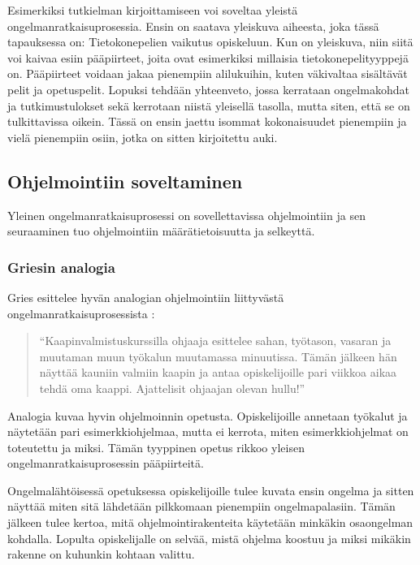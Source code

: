 Esimerkiksi tutkielman kirjoittamiseen voi soveltaa yleistä
ongelmanratkaisuprosessia. Ensin on saatava yleiskuva aiheesta, joka tässä
tapauksessa on: Tietokonepelien vaikutus opiskeluun. Kun on yleiskuva, niin
siitä voi kaivaa esiin pääpiirteet, joita ovat esimerkiksi millaisia
tietokonepelityyppejä on. Pääpiirteet voidaan jakaa pienempiin alilukuihin,
kuten väkivaltaa sisältävät pelit ja opetuspelit. Lopuksi tehdään yhteenveto,
jossa kerrataan ongelmakohdat ja tutkimustulokset sekä kerrotaan niistä
yleisellä tasolla, mutta siten, että se on tulkittavissa oikein. Tässä on ensin
jaettu isommat kokonaisuudet pienempiin ja vielä pienempiin osiin, jotka on
sitten kirjoitettu auki.

\subsection{Ohjelmointiin soveltaminen}

Yleinen ongelmanratkaisuprosessi on sovellettavissa ohjelmointiin ja sen
seuraaminen tuo ohjelmointiin määrätietoisuutta ja selkeyttä.

\subsubsection{Griesin analogia}

Gries esittelee hyvän analogian ohjelmointiin liittyvästä
ongelmanratkaisuprosessista \cite{Gries:1974:WTI:953057.810447}:

\begin{quotation}
``Kaapinvalmistuskurssilla ohjaaja esittelee sahan, työtason, vasaran ja
muutaman muun työkalun muutamassa minuutissa. Tämän jälkeen hän näyttää
kauniin valmiin kaapin ja antaa opiskelijoille pari viikkoa aikaa tehdä oma
kaappi. Ajattelisit ohjaajan olevan hullu!''
\end{quotation}

Analogia kuvaa hyvin ohjelmoinnin opetusta. Opiskelijoille annetaan työkalut ja
näytetään pari esimerkkiohjelmaa, mutta ei kerrota, miten esimerkkiohjelmat on
toteutettu ja miksi. Tämän tyyppinen opetus rikkoo yleisen
ongelmanratkaisuprosessin pääpiirteitä.

Ongelmalähtöisessä opetuksessa opiskelijoille tulee kuvata ensin ongelma ja
sitten näyttää miten sitä lähdetään pilkkomaan pienempiin ongelmapalasiin. Tämän
jälkeen tulee kertoa, mitä ohjelmointirakenteita käytetään minkäkin osaongelman
kohdalla. Lopulta opiskelijalle on selvää, mistä ohjelma koostuu ja miksi
mikäkin rakenne on kuhunkin kohtaan valittu.

